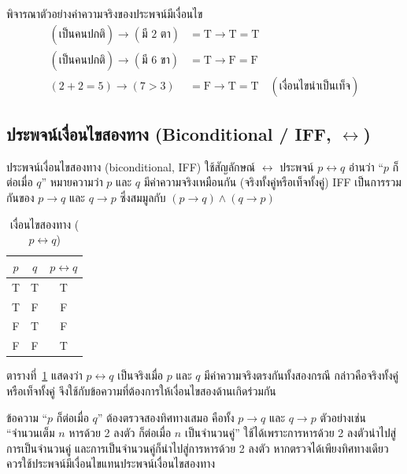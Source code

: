 \noindent พิจารณาตัวอย่างค่าความจริงของประพจน์มีเงื่อนไข
\begin{align*}
(\text{เป็นคนปกติ}) \rightarrow (\text{มี 2 ตา}) &= \text{T} \rightarrow \text{T} = \text{T}\\
(\text{เป็นคนปกติ}) \rightarrow (\text{มี 6 ขา}) &= \text{T} \rightarrow \text{F} = \text{F}\\
(2+2=5) \rightarrow (7>3) &= \text{F} \rightarrow \text{T} = \text{T}\quad (\text{เงื่อนไขนำเป็นเท็จ})
\end{align*}

\subsection{ประพจน์เงื่อนไขสองทาง (Biconditional / IFF, $\leftrightarrow$)}

ประพจน์เงื่อนไขสองทาง (biconditional, IFF) ใช้สัญลักษณ์ $\leftrightarrow$ ประพจน์ $p \leftrightarrow q$ อ่านว่า ``$p$ ก็ต่อเมื่อ $q$'' หมายความว่า $p$ และ $q$ มีค่าความจริงเหมือนกัน (จริงทั้งคู่หรือเท็จทั้งคู่) IFF เป็นการรวมกันของ $p \rightarrow q$ และ $q \rightarrow p$ ซึ่งสมมูลกับ $(p \rightarrow q) \land (q \rightarrow p)$~\parencite{copi2014logic}

\begin{table}[H]
    \centering
    \caption{เงื่อนไขสองทาง ($p \leftrightarrow q$)}
    \label{tab:iff-truth}
    \begin{tabular}{|c|c|c|}
        \hline
        \textbf{$p$} & \textbf{$q$} & \textbf{$p \leftrightarrow q$} \\ \hline
        T & T & T \\ \hline
        T & F & F \\ \hline
        F & T & F \\ \hline
        F & F & T \\ \hline
    \end{tabular}
\end{table}

ตารางที่~\ref{tab:iff-truth} แสดงว่า $p\leftrightarrow q$ เป็นจริงเมื่อ $p$ และ $q$ มีค่าความจริงตรงกันทั้งสองกรณี กล่าวคือจริงทั้งคู่หรือเท็จทั้งคู่ จึงใช้กับข้อความที่ต้องการให้เงื่อนไขสองด้านเกิดร่วมกัน

ข้อความ ``$p$ ก็ต่อเมื่อ $q$'' ต้องตรวจสองทิศทางเสมอ คือทั้ง $p\rightarrow q$ และ $q\rightarrow p$ ตัวอย่างเช่น ``จำนวนเต็ม $n$ หารด้วย 2 ลงตัว ก็ต่อเมื่อ $n$ เป็นจำนวนคู่'' ใช้ได้เพราะการหารด้วย 2 ลงตัวนำไปสู่การเป็นจำนวนคู่ และการเป็นจำนวนคู่ก็นำไปสู่การหารด้วย 2 ลงตัว หากตรวจได้เพียงทิศทางเดียว ควรใช้ประพจน์มีเงื่อนไขแทนประพจน์เงื่อนไขสองทาง

